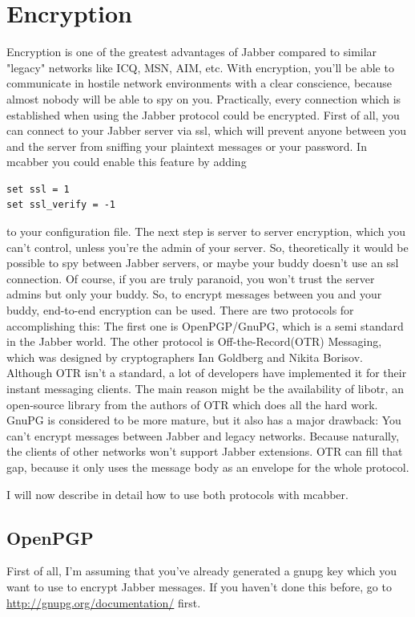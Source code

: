 \documentclass[12pt,oneside,a4]{book}
\begin{document}
\chapter{Encryption}
Encryption is one of the greatest advantages of Jabber compared to similar
"legacy" networks like ICQ, MSN, AIM, etc. With encryption, you'll be able
to communicate in hostile network environments with a clear conscience,
because almost nobody will be able to spy on you. Practically, every connection
which is established when using the Jabber protocol could be encrypted.
First of all, you can connect to your Jabber server via ssl, which will
prevent anyone between you and the server from sniffing your plaintext
messages or your password. In mcabber you could enable this feature by adding
\begin{lstlisting}
set ssl = 1
set ssl_verify = -1
\end{lstlisting}
to your configuration file.
The next step is server to server encryption, which you can't control,
unless you're the admin of your server. So, theoretically it would be possible
to spy between Jabber servers, or maybe your buddy doesn't use an ssl
connection. Of course, if you are truly paranoid, you won't trust the
server admins but only your buddy. So, to encrypt messages between you and your
buddy, end-to-end encryption can be used. There are two protocols for
accomplishing this: The first one is OpenPGP/GnuPG, which is a semi standard\cite{xep27}
in the Jabber world. The other protocol is Off-the-Record(OTR) Messaging, which was
designed by cryptographers Ian Goldberg and Nikita Borisov\cite{otr}. Although OTR
isn't a standard, a lot of developers have implemented it for their instant
messaging clients. The main reason might be the availability of libotr\cite{libotr},
an open-source library from the authors of OTR which does all the hard work.
GnuPG is considered to be more mature, but it also has a major drawback:
You can't encrypt messages between Jabber and legacy networks. Because
naturally, the clients of other networks won't support Jabber extensions.
OTR can fill that gap, because it only uses the message body as an envelope
for the whole protocol.

I will now describe in detail how to use both protocols with mcabber.
\section{OpenPGP}
First of all, I'm assuming that you've already generated a gnupg key
which you want to use to encrypt Jabber messages. If you haven't done
this before, go to \url{http://gnupg.org/documentation/} first.
\end{document}
